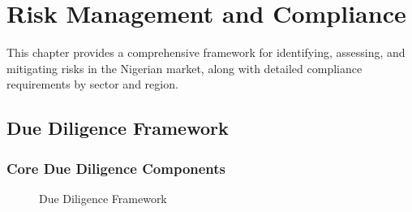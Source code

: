 
\chapter{Risk Management and Compliance}\label{ch:risk-management-and-compliance}

\begin{importantbox}
This chapter provides a comprehensive framework for identifying, assessing, and mitigating risks in the Nigerian market, along with detailed compliance requirements by sector and region.
\end{importantbox}

\section{Due Diligence Framework}\label{sec:due-diligence-framework}

\subsection{Core Due Diligence Components}\label{subsec:core-due-diligence-components}

\begin{figure}[htbp]
    \centering
    \caption{Due Diligence Framework}
    \label{fig:due-diligence}
\end{figure}

